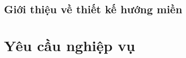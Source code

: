 \documentclass{article} %
\begin{document}
% 


\subsection{Giới thiệu về thiết kế hướng miền}

% 

\section{Yêu cầu nghiệp vụ}

% 


% 


% 
\end{document}
